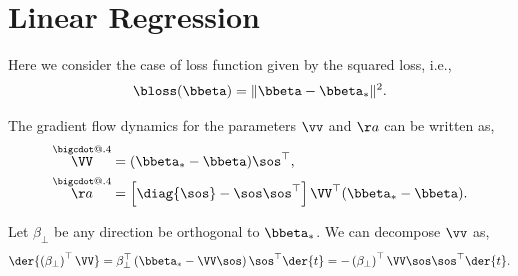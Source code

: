 \documentclass{article}
\makeatletter
\newcommand*\bigcdot{\mathpalette\bigcdot@{.4}}
\newcommand*\bigcdot@[2]{\mathbin{\vcenter{\hbox{\scalebox{#2}{$\m@th#1\bullet$}}}}}
\newcommand{\mdot}[1]{\overset{\bigcdot}{#1}}
\theoremstyle{plain}
\theoremstyle{definition}
\theoremstyle{remark}
\makeatother
\begin{document}
\section{Linear Regression}

Here we consider the case of loss function given by the squared loss, i.e., 
\begin{align} \label{eq:sq_loss_beta}
    \bloss(\bbeta) = \| \bbeta - \bbeta_* \|^2.
\end{align}


The gradient flow dynamics for the parameters $\vv$ and $\aa$ can be written as,
\begin{align}\label{eq:gradient-flow-v-a-square}
    \mdot{\VV} &= ( \bbeta_* - \bbeta ) \sos^{\top}, \\
    \mdot{\aa} &= \left[ \diag{\sos} - \sos \sos^{\top} \right] \VV^{\top} ( \bbeta_* - \bbeta ).
\end{align}

Let $\beta_{\perp}$ be any direction be orthogonal to $\bbeta_*$. We can decompose $\vv$ as,
\begin{align*}
   \der{ \left( \beta_{\perp} \right)^{\top} \VV }  &= \beta_{\perp}^{\top} \left( \bbeta_* - \VV \sos \right) \sos^{\top} \der{t} = -  \left( \beta_{\perp} \right)^{\top} \VV \sos \sos^{\top} \der{t}. \\
\end{align*}
\end{document}
